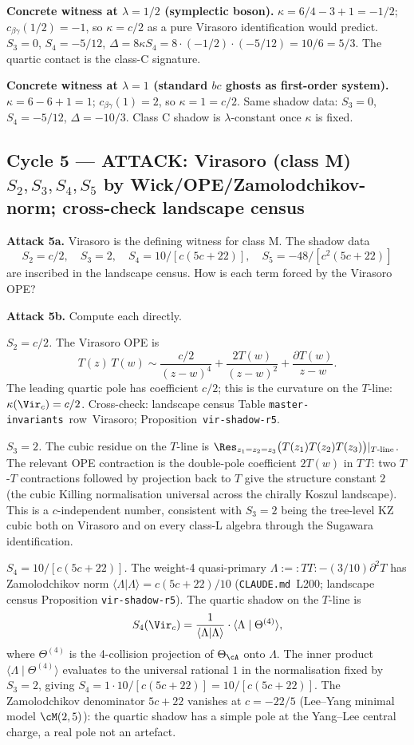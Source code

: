 \textbf{Concrete witness at $\lambda = 1/2$ (symplectic boson).}
$\kappa = 6/4 - 3 + 1 = -1/2$; $c_{\beta\gamma}(1/2) = -1$, so
$\kappa = c/2$ as a pure Virasoro identification would predict.
$S_3 = 0$, $S_4 = -5/12$, $\Delta = 8\kappa S_4 = 8\cdot(-1/2)\cdot
(-5/12) = 10/6 = 5/3$. The quartic contact is the class-C signature.

\textbf{Concrete witness at $\lambda = 1$ (standard $bc$ ghosts as
first-order system).} $\kappa = 6 - 6 + 1 = 1$; $c_{\beta\gamma}(1)
= 2$, so $\kappa = 1 = c/2$. Same shadow data: $S_3 = 0$, $S_4 =
-5/12$, $\Delta = -10/3$. Class C shadow is $\lambda$-constant
once $\kappa$ is fixed.

\subsection*{Cycle 5 --- ATTACK: Virasoro (class M) $S_2, S_3, S_4, S_5$
by Wick/OPE/Zamolodchikov-norm; cross-check landscape census}

\textbf{Attack 5a.} Virasoro is the defining witness for class M.
The shadow data
\[
  S_2 = c/2, \quad S_3 = 2, \quad S_4 = 10/[c(5c+22)],
  \quad S_5 = -48/[c^2(5c+22)]
\]
are inscribed in the landscape census. How is each term forced by the
Virasoro OPE?

\textbf{Attack 5b.} Compute each directly.

\emph{$S_2 = c/2$.} The Virasoro OPE is
\[
  T(z)\,T(w) \sim \frac{c/2}{(z-w)^4} + \frac{2T(w)}{(z-w)^2}
             + \frac{\partial T(w)}{z-w}.
\]
The leading quartic pole has coefficient $c/2$; this is the curvature
on the $T$-line: $\kappa(\Vir_c) = c/2$. Cross-check: landscape
census Table
\texttt{master-invariants}~row~Virasoro;
Proposition~\texttt{vir-shadow-r5}.

\emph{$S_3 = 2$.} The cubic residue on the $T$-line is
$\Res_{z_1 = z_2 = z_3}\bigl(T(z_1) T(z_2) T(z_3)\bigr)|_{T\text{-line}}$.
The relevant OPE contraction is the double-pole coefficient $2T(w)$
in $T\,T$: two $T$-$T$ contractions followed by projection back to
$T$ give the structure constant $2$ (the cubic Killing normalisation
universal across the chirally Koszul landscape). This is a
$c$-independent number, consistent with $S_3 = 2$ being the
tree-level KZ cubic both on Virasoro and on every class-L algebra
through the Sugawara identification.

\emph{$S_4 = 10/[c(5c+22)]$.} The weight-4 quasi-primary
$\Lambda := {:}TT{:} - (3/10)\partial^2 T$ has Zamolodchikov norm
$\langle\Lambda|\Lambda\rangle = c(5c+22)/10$
(\texttt{CLAUDE.md}~L200; landscape census Proposition
\texttt{vir-shadow-r5}). The quartic shadow on the $T$-line is
\[
  S_4(\Vir_c) = \frac{1}{\langle\Lambda|\Lambda\rangle}
             \cdot \langle\Lambda\mid\Theta^{(4)}\rangle,
\]
where $\Theta^{(4)}$ is the 4-collision projection of $\Theta_\cA$
onto $\Lambda$. The inner product $\langle\Lambda\mid\Theta^{(4)}
\rangle$ evaluates to the universal rational $1$ in the normalisation
fixed by $S_3 = 2$, giving $S_4 = 1\cdot 10/[c(5c+22)] = 10/[c(5c+22)]$.
The Zamolodchikov denominator $5c+22$ vanishes at $c = -22/5$
(Lee--Yang minimal model $\cM(2,5)$): the quartic shadow has a simple
pole at the Yang--Lee central charge, a real pole not an artefact.

